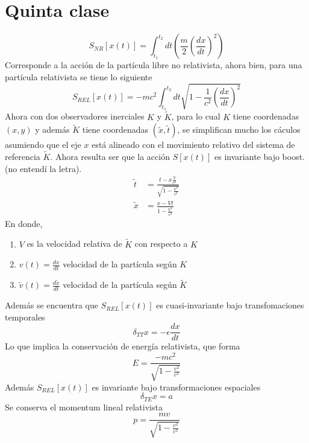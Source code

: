 \documentclass[../main.tex]{subfiles}
\begin{document}
\section{Quinta clase}
\begin{equation}
  S_{NR}[x(t)]= \int_{t_1}^{t_2} dt \left(\frac{m}{2}\left( \frac{dx}{dt}\right)^2 \right)
\end{equation}
Corresponde a la acción de la partícula libre no relativista, ahora bien, para una partícula relativista se tiene lo siguiente
\begin{equation}
  S_{REL}[x(t)]=-mc^2\int_{t_1}^{t_2} dt \sqrt{1-\frac{1}{c^2}\left( \frac{dx}{dt}\right)^2} 
\end{equation}
Ahora con dos observadores inerciales $K$ y $\tilde{K}$, para lo cual $K$ tiene coordenadas $(x,y)$ y además $\tilde{K}$ tiene coordenadas  $(\tilde{x},\tilde{t})$, se simplifican mucho los cáculos asumiendo que el eje $x$ está alineado con el movimiento relativo del sistema de referencia $\tilde{K}$. Ahora resulta ser que la acción $S[x(t)]$ es invariante bajo boost. (no entendí la letra). 
\begin{align*}
  \tilde{t} & = \frac{t-x\frac{V}{c^2}}{\sqrt{1-\frac{V^2}{c^2}}} \\
  \tilde{x} & = \frac{x-Vt}{1-\frac{V^2}{c^2}}
\end{align*}
En donde,
\begin{enumerate}
  \item $V$ es la velocidad relativa de $\tilde{K}$ con respecto a $K$
  \item $v(t)=\frac{dx}{dt}$ velocidad de la partícula según $K$
  \item $\tilde{v}(t)=\frac{d\tilde{x}}{dt}$ velocidad de la partícula según $\tilde{K}$ 
\end{enumerate}
Además se encuentra que $S_{REL}[x(t)]$ es cuasi-invariante bajo transfomaciones temporales
\begin{equation}
  \delta_{TT} x = -\epsilon \frac{dx}{dt}
\end{equation}
Lo que implica la conservación de energía relativista, que forma
\begin{equation}
  E=\frac{-mc^2}{\sqrt{1-\frac{v^2}{c^2}}}
\end{equation}
Además $S_{REL}[x(t)]$ es invariante bajo transformaciones espaciales 
\begin{equation}
  \delta_{TE} x = a
\end{equation}
Se conserva el momentum lineal relativista
\begin{equation}
  p = \frac{mv}{\sqrt{1-\frac{v^2}{c^2}}}
\end{equation}
\end{document}
